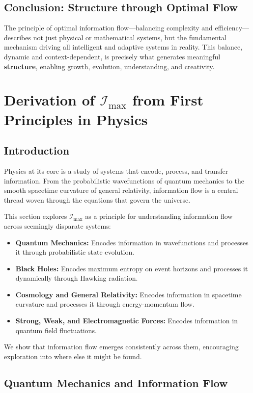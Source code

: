 \documentclass[12pt]{article}
\begin{document}
\subsection{Conclusion: Structure through Optimal Flow}
The principle of optimal information flow—balancing complexity and efficiency—describes not just physical or mathematical systems, but the fundamental mechanism driving all intelligent and adaptive systems in reality. This balance, dynamic and context-dependent, is precisely what generates meaningful \textbf{structure}, enabling growth, evolution, understanding, and creativity.


\section{Derivation of \(\mathcal{I}_{\text{max}}\) from First Principles in Physics}


\subsection{Introduction}

Physics at its core is a study of systems that encode, process, and transfer information. From the probabilistic wavefunctions of quantum mechanics to the smooth spacetime curvature of general relativity, information flow is a central thread woven through the equations that govern the universe. 

This section explores \(\mathcal{I}_{\text{max}}\) as a principle for understanding information flow across seemingly disparate systems:
\begin{itemize}
    \item \textbf{Quantum Mechanics:} Encodes information in wavefunctions and processes it through probabilistic state evolution.
    \item \textbf{Black Holes:} Encodes maximum entropy on event horizons and processes it dynamically through Hawking radiation.
    \item \textbf{Cosmology and General Relativity:} Encodes information in spacetime curvature and processes it through energy-momentum flow.
    \item \textbf{Strong, Weak, and Electromagnetic Forces:} Encodes information in quantum field fluctuations.
\end{itemize}
We show that information flow emerges consistently across them, encouraging exploration into where else it might be found.


\subsection{Quantum Mechanics and Information Flow}
\end{document}
